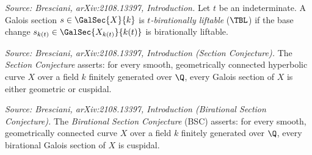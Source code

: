 \begin{definition}[TBiratLiftable]
  \label{def:tbirl}
  \textit{Source: Bresciani, arXiv:2108.13397, Introduction.}
  Let \(t\) be an indeterminate. A Galois section \(s \in \GalSec{X}{k}\) is
  \emph{\(t\)-birationally liftable} (\(\TBL\)) if the base change
  \(s_{k(t)} \in \GalSec{X_{k(t)}}{k(t)}\) is birationally liftable.
\end{definition}


\begin{definition}[SectionConjecture]
  \label{def:section-conjecture}
  \textit{Source: Bresciani, arXiv:2108.13397, Introduction (Section Conjecture).}
  The \emph{Section Conjecture} asserts: for every smooth, geometrically connected
  hyperbolic curve \(X\) over a field \(k\) finitely generated over \(\Q\), every
  Galois section of \(X\) is either geometric or cuspidal.
\end{definition}

\begin{definition}[BiratSectionConj]
  \label{def:bsc}
  \textit{Source: Bresciani, arXiv:2108.13397, Introduction (Birational Section Conjecture).}
  The \emph{Birational Section Conjecture} (BSC) asserts: for every smooth,
  geometrically connected curve \(X\) over a field \(k\) finitely generated over
  \(\Q\), every birational Galois section of \(X\) is cuspidal.
\end{definition}

